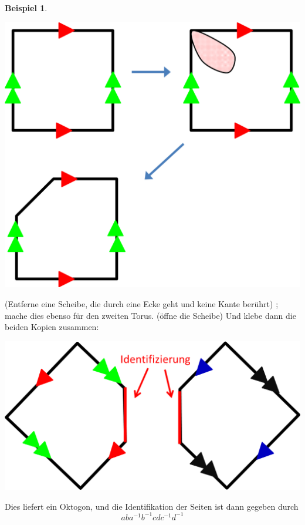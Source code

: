 \documentclass[a4paper,11pt,notitlepage]{report}
\theoremstyle{definition}
\newtheorem{example}{Beispiel}[chapter]
\begin{document}
\begin{example}
	 \begin{center}
	 	\includegraphics[scale=0.5]{images/2012_01_10_Bild18.png}
	 \end{center}
	 (Entferne eine Scheibe, die durch eine Ecke geht und keine Kante berührt)
	 \newline
	 ; mache dies ebenso für den zweiten Torus.
	 \newline
	 (öffne die Scheibe)
	 \newline
	 Und klebe dann die beiden Kopien zusammen:
	 \begin{center}
	 	\includegraphics[scale=0.5]{images/2012_01_10_Bild19.png}
	 \end{center}
	 Dies liefert ein Oktogon, und die Identifikation der Seiten ist dann gegeben durch
	 $$aba^{-1}b^{-1} cdc^{-1}d^{-1}$$
\end{example}
\end{document}
